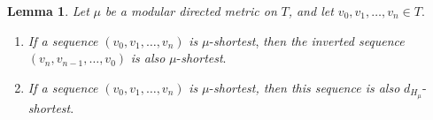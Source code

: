 \documentclass[11pt]{article}
\theoremstyle{definition}
\newtheorem{lemma}[theorem]{Lemma}
\begin{document}
\begin{lemma}
\label{metric->graph-shortest}
\textit{Let} $\mu$\textit{ be a modular directed metric on} $T$\textit{, and let $v_0,v_1,\ldots,v_n\in T$}.
\begin{enumerate}[label=(\arabic*),ref=\arabic*]
    \item \textit{If a sequence} $(v_0,v_1,\ldots,v_n)$ \textit{is} $\mu$-\textit{shortest}, \textit{then the inverted sequence} $(v_n,v_{n-1},\ldots,v_0)$ \textit{is also} $\mu$-\textit{shortest}.
    \label{lemma14:case1}
    \item \textit{If a sequence} $(v_0,v_1,\ldots,v_n)$ \textit{is} $\mu$-\textit{shortest, then this sequence is also} $d_{H_\mu}$-\textit{shortest}.
    \label{lemma14:case2}
\end{enumerate}
\end{lemma}
\end{document}
